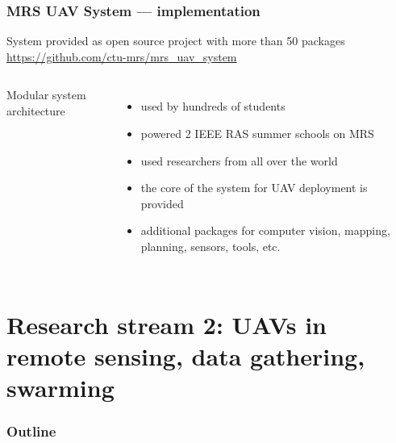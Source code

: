 \documentclass[aspectratio=169]{beamer}
\begin{document}
\begin{frame}
\frametitle{MRS UAV System --- implementation}

\begin{block}{System provided as open source project with more than 50 packages}
  \centering
  \url{https://github.com/ctu-mrs/mrs_uav_system}
\end{block}

\begin{columns}[c]


\begin{block}{Modular system architecture}
  \begin{adjustbox}{max totalsize={1.0\textwidth}{.65\textheight}, center}
    
  \end{adjustbox}
\end{block}


\begin{itemize}
  \item used by hundreds of students
  \item powered 2 IEEE RAS summer schools on MRS
  \item used researchers from all over the world
  \item the core of the system for UAV deployment is provided
  \item additional packages for computer vision, mapping, planning, sensors, tools, etc.
\end{itemize}

\end{columns}

\end{frame}



\section{Research stream 2: UAVs in remote sensing, data gathering, swarming}

\begin{frame}
  \frametitle{Outline}
  \tableofcontents[currentsection]
\end{frame}


\end{document}
